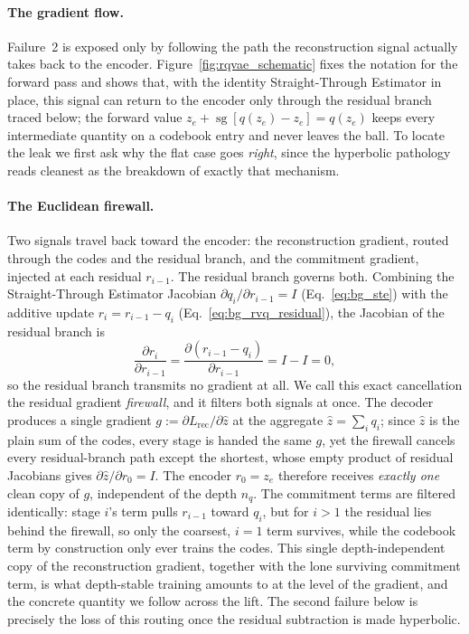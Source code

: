\documentclass[12pt]{report}
\begin{document}
\paragraph{The gradient flow.}
Failure~2 is exposed only by following the path the reconstruction signal actually takes back to the encoder. Figure~\ref{fig:rqvae_schematic} fixes the notation for the forward pass and shows that, with the identity Straight-Through Estimator in place, this signal can return to the encoder only through the residual branch traced below; the forward value $z_e+\operatorname{sg}[q(z_e)-z_e]=q(z_e)$ keeps every intermediate quantity on a codebook entry and never leaves the ball. To locate the leak we first ask why the flat case goes \emph{right}, since the hyperbolic pathology reads cleanest as the breakdown of exactly that mechanism.

\paragraph{The Euclidean firewall.}
Two signals travel back toward the encoder: the reconstruction gradient, routed through the codes and the residual branch, and the commitment gradient, injected at each residual $r_{i-1}$. The residual branch governs both. Combining the Straight-Through Estimator Jacobian $\partial q_i/\partial r_{i-1}=I$ (Eq.~\ref{eq:bg_ste}) with the additive update $r_i = r_{i-1}-q_i$ (Eq.~\ref{eq:bg_rvq_residual}), the Jacobian of the residual branch is
\begin{equation}
    \label{eq:firewall}
    \frac{\partial r_i}{\partial r_{i-1}}
    = \frac{\partial (r_{i-1} - q_i)}{\partial r_{i-1}}
    = I - I = 0,
\end{equation}
so the residual branch transmits no gradient at all. We call this exact cancellation the residual gradient \emph{firewall}, and it filters both signals at once. The decoder produces a single gradient $g := \partial L_{\text{rec}}/\partial\hat z$ at the aggregate $\hat z=\sum_i q_i$; since $\hat z$ is the plain sum of the codes, every stage is handed the same $g$, yet the firewall cancels every residual-branch path except the shortest, whose empty product of residual Jacobians gives $\partial\hat z/\partial r_0 = I$. The encoder $r_0=z_e$ therefore receives \emph{exactly one} clean copy of $g$, independent of the depth $n_q$. The commitment terms are filtered identically: stage $i$'s term pulls $r_{i-1}$ toward $q_i$, but for $i>1$ the residual lies behind the firewall, so only the coarsest, $i=1$ term survives, while the codebook term by construction only ever trains the codes. This single depth-independent copy of the reconstruction gradient, together with the lone surviving commitment term, is what depth-stable training amounts to at the level of the gradient, and the concrete quantity we follow across the lift. The second failure below is precisely the loss of this routing once the residual subtraction is made hyperbolic.
\end{document}
